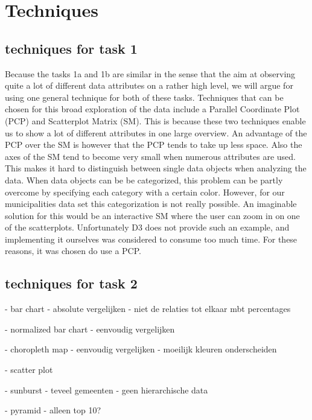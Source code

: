 \section{Techniques}

\subsection{techniques for task 1}
Because the tasks 1a and 1b are similar in the sense that the aim at observing quite a lot of different data attributes on a rather high level, we will argue for using one general technique for both of these tasks. Techniques that can be chosen for this broad exploration of the data include a Parallel Coordinate Plot (PCP) and Scatterplot Matrix (SM). This is because these two techniques enable us to show a lot of different attributes in one large overview. An advantage of the PCP over the SM is however that the PCP tends to take up less space. Also the axes of the SM tend to become very small when numerous attributes are used. This makes it hard to distinguish between single data objects when analyzing the data. When data objects can be be categorized, this problem can be partly overcome by specifying each category with a certain color. However, for our municipalities data set this categorization is not really possible. An imaginable solution for this would be an interactive SM where the user can zoom in on one of the scatterplots. Unfortunately D3 \cite{D3} does not provide such an example, and implementing it ourselves was considered to consume too much time. For these reasons, it was chosen do use a PCP.




\subsection{techniques for task 2}
- bar chart
 - absolute vergelijken
 - niet de relaties tot elkaar mbt percentages

- normalized bar chart
 - eenvoudig vergelijken

- choropleth map
 - eenvoudig vergelijken
 - moeilijk kleuren onderscheiden

- scatter plot

- sunburst
 - teveel gemeenten
 - geen hierarchische data

- pyramid
 - alleen top 10?




